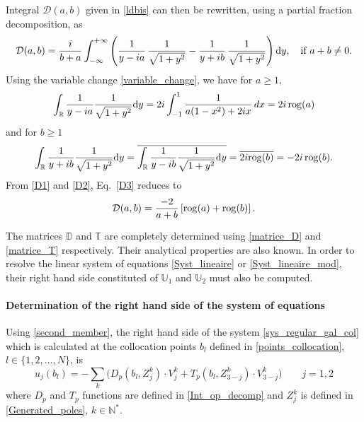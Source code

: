 Integral $\mathcal{D}(a,b)$ given in \eqref{ldbis} can then be rewritten, using a partial fraction decomposition, as
\begin{equation}
\label{D3}
 \mathcal{D}(a,b) = \dfrac{i}{b+a} \int_{-\infty}^{+\infty} \left( \dfrac{1}{y - ia} \, \dfrac{1}{\sqrt{1+y^2}} - \dfrac{1}{y + ib}  \, \dfrac{1}{\sqrt{1+y^2}}  \right) {\rm d} y, \quad \text{if } a+b \neq 0.
\end{equation}
Using the variable change \eqref{variable_change}, we have for $a \geq 1$,
\begin{equation}
\label{D1}
\int_\mathbb R {1\over y-ia}{1\over \sqrt {1+y^2}}{\rm d} y  =  2i \int_{-1}^{1} \dfrac{1}{a(1-x^2)+2ix} \, dx = 2i \, {\rm rog} (a)
\end{equation}
and for $b \geq 1$
\begin{equation}
\label{D2}
\int_\mathbb R {1\over y+ib}{1\over \sqrt {1+y^2}}{\rm d} y= \overline{\int_\mathbb R  {1\over y-ib}{1\over \sqrt {1+y^2}}{\rm d} y}=\overline{2i {\rm rog}(b)}=-2i \, {\rm rog}(b).
\end{equation}
From \eqref{D1} and \eqref{D2}, Eq.~\eqref{D3} reduces to
\begin{equation}
\label{ld}
\mathcal{D}(a,b) = \dfrac{-2}{a+b} \left[ {\rm rog}(a) + {\rm rog}(b)\right].
\end{equation}

The matrices $\mathbb{D}$ and $\mathbb{T}$ are completely determined using \eqref{matrice_D} and \eqref{matrice_T} respectively. Their analytical properties are also known. In order to resolve the linear system of equations \eqref{Syst_lineaire} or \eqref{Syst_lineaire_mod},  their right hand side constituted of $\mathbb{U}_1$ and $\mathbb{U}_2$ must also be computed.

\paragraph{Determination of the right hand side of the system of equations}


Using \eqref{second_member}, the right hand side of the system \eqref{sys_regular_gal_col} which is calculated at the collocation points $b_l$ defined in \eqref{points_collocation}, $l \in \{ 1,2, \ldots, N \}$, is 
\begin{equation}
\label{second_member_new}
u_j(b_l) = -\sum_k \Big( D_p(b_l,Z_j^k)\cdot V_j^k+ T_p(b_l,Z_{3-j}^k)\cdot V_{3-j}^k\Big) \qquad j=1,2
\end{equation}
where $D_p$ and $T_p$ functions are defined in \eqref{Int_op_decomp} and $Z_j^k$ is defined in \eqref{Generated_poles}, $k \in \mathbb{N}^*$. 

